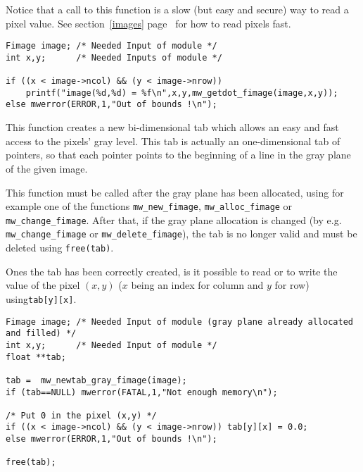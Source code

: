 Notice that a call to this function is a slow (but easy and secure) way to 
read a pixel value. See section~\ref{images} page~\pageref{images} for how to read pixels fast.

\Next
\Example
\begin{verbatim}
Fimage image; /* Needed Input of module */
int x,y;      /* Needed Inputs of module */

if ((x < image->ncol) && (y < image->nrow))
	printf("image(%d,%d) = %f\n",x,y,mw_getdot_fimage(image,x,y));
else mwerror(ERROR,1,"Out of bounds !\n");

\end{verbatim}

\newpage %

\Description
This function creates a new bi-dimensional tab which allows an easy and fast
access to the pixels' gray level.
This tab is actually an one-dimensional tab of pointers, so that each pointer 
points to the beginning of a line in the gray plane of the given image.

This function must be called after the gray plane has been allocated,
using for example one of the functions \verb+mw_new_fimage+, 
\verb+mw_alloc_fimage+ or \verb+mw_change_fimage+. 
After that, if the gray plane allocation is changed
(by e.g. \verb+mw_change_fimage+ or \verb+mw_delete_fimage+), the tab is
no longer valid and must be deleted using \verb+free(tab)+.

Ones the tab has been correctly created, is it possible to read or to
write the value of the pixel $(x,y)$ ($x$ being an index for column and $y$
for row) using\verb+tab[y][x]+.

\Next
\Example
\begin{verbatim}
Fimage image; /* Needed Input of module (gray plane already allocated and filled) */
int x,y;      /* Needed Input of module */
float **tab;

tab =  mw_newtab_gray_fimage(image);
if (tab==NULL) mwerror(FATAL,1,"Not enough memory\n");

/* Put 0 in the pixel (x,y) */
if ((x < image->ncol) && (y < image->nrow)) tab[y][x] = 0.0;
else mwerror(ERROR,1,"Out of bounds !\n");

free(tab);

\end{verbatim}

